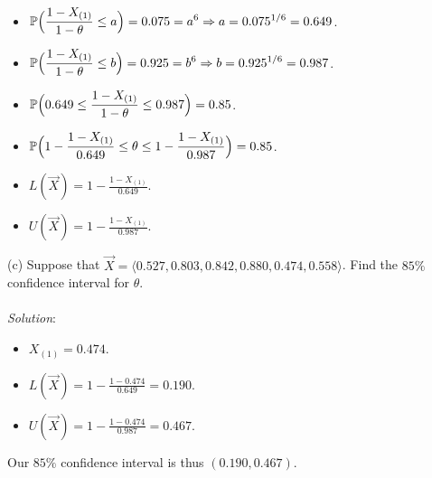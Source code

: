 \documentclass[12pt]{article}
\newcommand{\ds}{\displaystyle}
\begin{document}
\begin{itemize}
    \item $ \ds \mathbb{P} \Bigl( \frac{1 - X_{(1)}}{1 - \theta} \le a \Bigr) = 0.075 = a^{6} \Rightarrow a = 0.075^{1/6} = 0.649 $. \\
    \item $ \ds \mathbb{P} \Bigl( \frac{1 - X_{(1)}}{1 - \theta} \le b \Bigr) = 0.925 = b^{6} \Rightarrow b = 0.925^{1/6} = 0.987 $. \\
    \item $ \ds \mathbb{P} \Bigl( 0.649 \le \frac{1 - X_{(1)}}{1 - \theta} \le 0.987 \Bigr) = 0.85 $. \\
    \item $ \ds \mathbb{P} \Bigl( 1 - \frac{1- X_{(1)}}{0.649} \le \theta \le 1 - \frac{1- X_{(1)}}{0.987} \Bigr) = 0.85 $. \\
    \item $ \ds L(\overrightarrow{X}) = 1 - \frac{1- X_{(1)}}{0.649} $. \\
    \item $ \ds U(\overrightarrow{X}) = 1 - \frac{1- X_{(1)}}{0.987} $. \\
\end{itemize}

\vspace{2.5mm}

(c) Suppose that $ \overrightarrow{X} = \langle 0.527, 0.803, 0.842, 0.880, 0.474, 0.558 \rangle $. 
Find the $ 85\% $ confidence interval for $ \theta $. \\
\vspace{2.5mm} \\
\textit{Solution}:
\vspace{2.5mm} \\

\begin{itemize}
    \item $ \ds X_{(1)} = 0.474 $. \\
    \item $ \ds L(\overrightarrow{X}) = 1 - \frac{1- 0.474}{0.649} = 0.190 $. \\
    \item $ \ds U(\overrightarrow{X}) = 1 - \frac{1- 0.474}{0.987} = 0.467 $. \\
\end{itemize}

\noindent
Our $ 85\% $ confidence interval is thus $ (0.190, 0.467) $. \\
\end{document}
